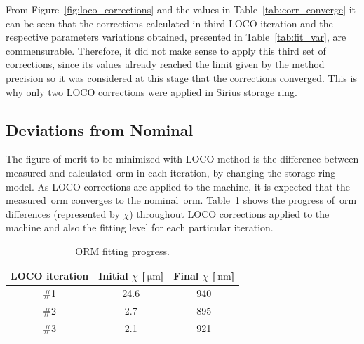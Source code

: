 From Figure~\ref{fig:loco_corrections} and the values in Table~\ref{tab:corr_converge} it can be seen that the corrections calculated in third LOCO iteration and the respective parameters variations obtained, presented in Table~\ref{tab:fit_var}, are commensurable. Therefore, it did not make sense to apply this third set of corrections, since its values already reached the limit given by the method precision so it was considered at this stage that the corrections converged. This is why only two LOCO corrections were applied in Sirius storage ring.

\subsection{Deviations from Nominal}
The figure of merit to be minimized with LOCO method is the difference between measured and calculated~\gls{orm} in each iteration, by changing the storage ring model. As LOCO corrections are applied to the machine, it is expected that the measured~\gls{orm} converges to the nominal~\gls{orm}. Table~\ref{tab:orm_progress} shows the progress of~\gls{orm} differences (represented by $\chi$) throughout LOCO corrections applied to the machine and also the fitting level for each particular iteration.
\begin{table}
    \centering
    \caption{ORM fitting progress.}
    \label{tab:orm_progress}
    \begin{tabular}{ccc}
        \toprule\toprule
        LOCO iteration & Initial $\chi$ [$\SI{}{\micro\meter}$] & Final $\chi$ [$\SI{}{\nano\meter}$] \\
        \hline
        \#1 & 24.6 & 940 \\
        \#2 & 2.7 & 895 \\
        \#3 & 2.1 & 921 \\
        \bottomrule\bottomrule
    \end{tabular}
\end{table}

